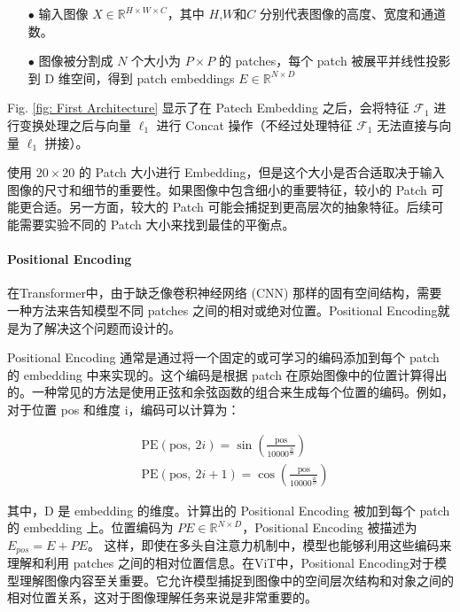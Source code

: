 \documentclass[a4paper, 10pt]{article}
\begin{document}
		\begin{itemize}
			\item[$\bullet$] 
			输入图像 $X \in \mathbb{R}^{H \times W \times C}$，其中 $H$,$W$和$C$ 分别代表图像的高度、宽度和通道数。
			\item[$\bullet$]
			图像被分割成 $N$ 个大小为 $P \times P$ 的 patches，每个 patch 被展平并线性投影到 D 维空间，得到 patch embeddings $E \in \mathbb{R}^{N \times D}$
		\end{itemize}
		
		Fig. \ref{fig: First Architecture} 显示了在 Patech Embedding 之后，会将特征 $\mathcal{F}_1$ 进行变换处理之后与向量 $\ell_1$ 进行 Concat 操作（不经过处理特征 $\mathcal{F}_1$ 无法直接与向量 $\ell_1$ 拼接）。
		
		使用 $20 \times 20$ 的 Patch 大小进行 Embedding，但是这个大小是否合适取决于输入图像的尺寸和细节的重要性。如果图像中包含细小的重要特征，较小的 Patch 可能更合适。另一方面，较大的 Patch 可能会捕捉到更高层次的抽象特征。后续可能需要实验不同的 Patch 大小来找到最佳的平衡点。
		
		\paragraph{Positional Encoding}
		
		在Transformer中，由于缺乏像卷积神经网络 (CNN) 那样的固有空间结构，需要一种方法来告知模型不同 patches 之间的相对或绝对位置。Positional Encoding就是为了解决这个问题而设计的。
		
		Positional Encoding 通常是通过将一个固定的或可学习的编码添加到每个 patch 的 embedding 中来实现的。这个编码是根据 patch 在原始图像中的位置计算得出的。一种常见的方法是使用正弦和余弦函数的组合来生成每个位置的编码。例如，对于位置 pos 和维度 i，编码可以计算为：
		
		\begin{equation}
			\begin{aligned}
				&\text{PE}(\text{pos}, \ 2i) = \sin \left(\frac{\text{pos}}{10000^{\frac{2i}{D}}}\right) \\
				&\text{PE}(\text{pos}, \ 2i + 1) = \cos \left(\frac{\text{pos}}{10000^{\frac{2i}{D}}}\right)
			\end{aligned}
			\label{eq: positional encoding}
		\end{equation}
		
		其中，D 是 embedding 的维度。计算出的 Positional Encoding 被加到每个 patch 的 embedding 上。位置编码为 $PE \in \mathbb{R}^{N \times D}$，Positional Encoding 被描述为 $E_{pos} = E + PE$。 这样，即使在多头自注意力机制中，模型也能够利用这些编码来理解和利用 patches 之间的相对位置信息。在ViT中，Positional Encoding对于模型理解图像内容至关重要。它允许模型捕捉到图像中的空间层次结构和对象之间的相对位置关系，这对于图像理解任务来说是非常重要的。
		
\end{document}
